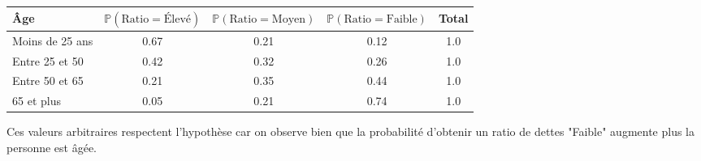 \documentclass{article}
\begin{document}
\begin{table}[H]
    \centering
    \renewcommand{\arraystretch}{1.3}
    \begin{tabular}{|l|c|c|c|c|} \hline
        \textbf{Âge} & \textbf{$\mathbb{P}(\text{Ratio} = \text{Élevé})$} & \textbf{$\mathbb{P}(\text{Ratio} = \text{Moyen})$} & \textbf{$\mathbb{P}(\text{Ratio} = \text{Faible})$} & \textbf{Total} \\ \hline
        Moins de 25 ans & 0.67 & 0.21 & 0.12 & 1.0 \\ \hline
        Entre 25 et 50 & 0.42 & 0.32 & 0.26 & 1.0 \\ \hline
        Entre 50 et 65 & 0.21 & 0.35 & 0.44 & 1.0 \\ \hline
        65 et plus & 0.05 & 0.21 & 0.74 & 1.0 \\ \hline
    \end{tabular}
\end{table}

Ces valeurs arbitraires respectent l'hypothèse car on observe bien que la probabilité d'obtenir un ratio de dettes "Faible" augmente plus la personne est âgée.
\end{document}
